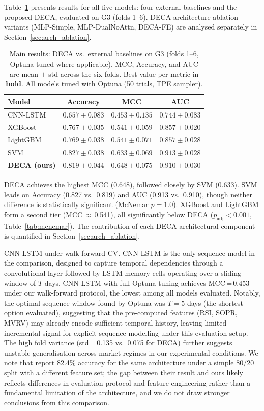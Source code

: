\documentclass[final,3p,times,authoryear]{elsarticle}
\begin{document}
Table~\ref{tab:mainresults} presents results for all five models:
four external baselines and the proposed DECA, evaluated on G3
(folds 1--6).
DECA architecture ablation variants (MLP-Simple, MLP-DualNoAttn,
DECA-FE) are analysed separately in Section~\ref{sec:arch_ablation}.
\begin{table}[ht]
\centering
\caption{Main results: DECA vs.\ external baselines on G3
  (folds 1--6, Optuna-tuned where applicable).
  MCC, Accuracy, and AUC are mean $\pm$ std across the six folds.
  Best value per metric in \textbf{bold}.
  All models tuned with Optuna (50 trials, TPE sampler).}
\label{tab:mainresults}
\small
\begin{tabular}{lccc}
\hline
Model & Accuracy & MCC & AUC \\
\hline
CNN-LSTM               & $0.657\pm0.083$ & $0.453\pm0.135$ & $0.744\pm0.083$ \\
XGBoost                & $0.767\pm0.035$ & $0.541\pm0.059$ & $0.857\pm0.020$ \\
LightGBM               & $0.769\pm0.038$ & $0.541\pm0.071$ & $0.857\pm0.028$ \\
SVM                    & $\mathbf{0.827\pm0.038}$ & $0.633\pm0.069$ & $\mathbf{0.913\pm0.028}$ \\
\textbf{DECA (ours)}   & $0.819\pm0.044$ & $\mathbf{0.648\pm0.075}$ & $0.910\pm0.030$ \\
\hline
\end{tabular}
\end{table}

DECA achieves the highest MCC (0.648), followed closely by SVM (0.633).
SVM leads on Accuracy (0.827 vs.\ 0.819) and AUC (0.913 vs.\ 0.910),
though neither difference is statistically significant (McNemar $p=1.0$).
XGBoost and LightGBM form a second tier (MCC\,$\approx$\,0.541),
all significantly below DECA ($p_{\text{adj}} < 0.001$,
Table~\ref{tab:mcnemar}).
The contribution of each DECA architectural component is quantified in
Section~\ref{sec:arch_ablation}.

\noindent CNN-LSTM under walk-forward CV.
CNN-LSTM is the only sequence model in the comparison, designed to
capture temporal dependencies through a convolutional layer followed by
LSTM memory cells operating over a sliding window of $T$ days.
CNN-LSTM with full Optuna tuning achieves MCC\,=\,0.453 under our
walk-forward protocol, the lowest among all models evaluated.
Notably, the optimal sequence window found by Optuna was $T=5$ days
(the shortest option evaluated), suggesting that the pre-computed
features (RSI, SOPR, MVRV) may already encode sufficient temporal
history, leaving limited incremental signal for explicit sequence
modelling under this evaluation setup.
The high fold variance (std\,=\,0.135 vs.\ 0.075 for DECA) further
suggests unstable generalisation across market regimes in our
experimental conditions.
We note that \citet{omole2024financial} report 82.4\% accuracy for the
same architecture under a simple 80/20 split with a different feature
set; the gap between their result and ours likely reflects differences
in evaluation protocol and feature engineering rather than a fundamental
limitation of the architecture, and we do not draw stronger conclusions
from this comparison.
\end{document}
